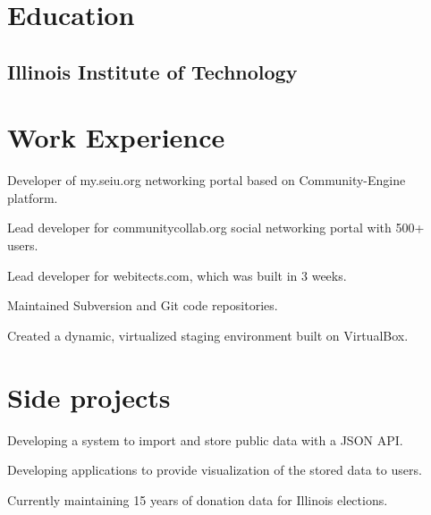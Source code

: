 \documentclass{resume}
\begin{document}
\author{Dmitry Ratnikov}
\maketitle

\section{Education}

\subsection{Illinois Institute of Technology}


\section{Work Experience}

\begin{compactitem}
  \item Developer of my.seiu.org networking portal based on Community-Engine platform.
  \item Lead developer for communitycollab.org social networking portal with 500+ users.
  \item Lead developer for webitects.com, which was built in 3 weeks.
  \item Maintained Subversion and Git code repositories.
  \item Created a dynamic, virtualized staging environment built on VirtualBox.
\end{compactitem}

\section{Side projects}
\begin{compactitem}
  \item Developing a system to import and store public data with a JSON API.
  \item Developing applications to provide visualization of the stored data to users.
  \item Currently maintaining 15 years of donation data for Illinois elections.
\end{compactitem}
\end{document}
